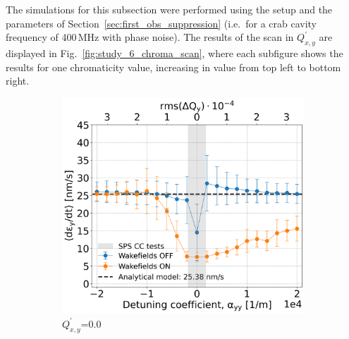 
The simulations for this subsection were performed using the setup and the parameters of Section~\ref{sec:first_obs_suppression} (i.e.~for a crab cavity frequency of 400\,MHz with phase noise). The results of the scan in $Q^\prime_{x,y}$ are displayed in Fig.~\ref{fig:study_6_chroma_scan}, where each subfigure shows the results for one chromaticity value, increasing in value from top left to bottom right. 
\begin{figure}[htp]
    \centering
    \begin{subfigure}{.45\textwidth}
        \centering
        \includegraphics[width=.95\linewidth]{images/Ch7/Qpx0.png}  
        \caption{$Q^\prime_{x,y}$=0.0}
        \label{fig:study_6_chroma_scan_Qpxy0}
    \end{subfigure}
    \begin{subfigure}{.45\textwidth}
        \centering

\end{subfigure}
\end{figure}
